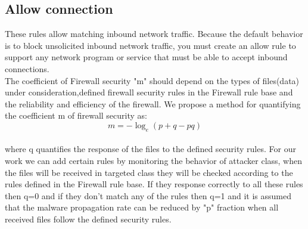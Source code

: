 \subsection{Allow connection}
        These rules allow matching inbound network traffic. Because the default  behavior is to block unsolicited inbound network traffic, you must create an allow rule to support any network program or service that must be able to accept inbound connections.\\
      The coefficient of Firewall security "m" should depend on the types of files(data) under consideration,defined firewall security rules in the Firewall rule base and the reliability and efficiency of the firewall. We propose a method for
          quantifying the coefficient m of firewall security as: \\
          $$m=-{\log_e (p+q-pq)}$$      \\
          where q quantifies the response of the files to the defined security rules.
For our work we can add certain rules by monitoring the behavior of attacker class, when the files will be received in targeted class they will be checked according to the rules defined in the Firewall rule base. If they response correctly to all these rules then q=0 and if they don't match any of the rules then q=1 and it is assumed that the malware propagation rate can be reduced by "p" fraction when all received files follow the defined security rules.

%
% 